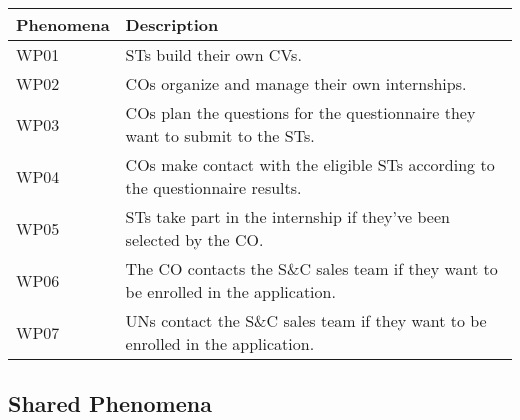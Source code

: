 \begin{table}[H]
    \centering
    \begin{longtable}{|l|p{}|}
        \hline
        \textbf{Phenomena} & \textbf{Description}                                                                \\
        \hline \hline
        WP01               & STs build their own CVs.                                                            \\
        \hline
        WP02               & COs organize and manage their own internships.                                      \\
        \hline
        WP03               & COs plan the questions for the questionnaire they want to submit to the STs.        \\
        \hline
        WP04               & COs make contact with the eligible STs according to the questionnaire results.      \\
        \hline
        WP05               & STs take part in the internship if they've been selected by the CO.                 \\
        \hline
        WP06               & The CO contacts the S\&C sales team if they want to be enrolled in the application. \\
        \hline
        WP07               & UNs contact the S\&C sales team if they want to be enrolled in the application.     \\
        \hline
    \end{longtable}
\end{table}

\subsection{Shared Phenomena}
\label{subsec:shared-phenomena}%

